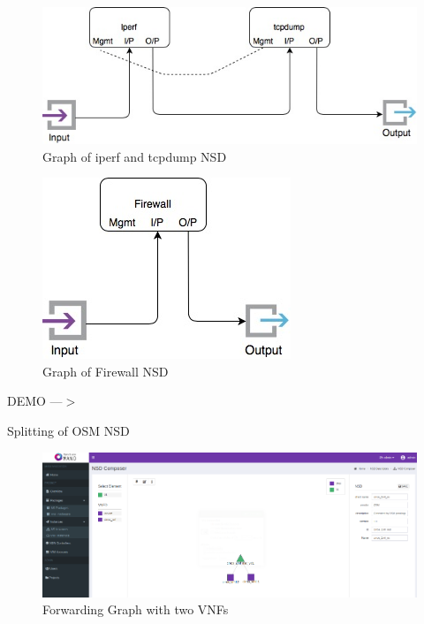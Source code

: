 \begin{frame}
\begin{figure} 
	\centering
	\includegraphics[width=0.6\linewidth]{images/img-4-split}
	\\Graph of iperf and tcpdump NSD
\end{figure}


\begin{figure}
	\centering
	\includegraphics[width=0.3\linewidth]{images/img-5-split}
	\\Graph of Firewall NSD\\
\end{figure}
\end{frame}

\begin{frame}

\Huge{\centerline{DEMO ---$ > $}}

\end{frame}

\begin{frame}
\Huge{\centerline{Splitting of OSM NSD}}
\end{frame}

\begin{frame}
\begin{figure}
	\centering
	\includegraphics[width=1\linewidth]{images/mainFG}
	\\Forwarding Graph with two VNFs
	\label{fig:mainfg}
\end{figure}
\end{frame}

